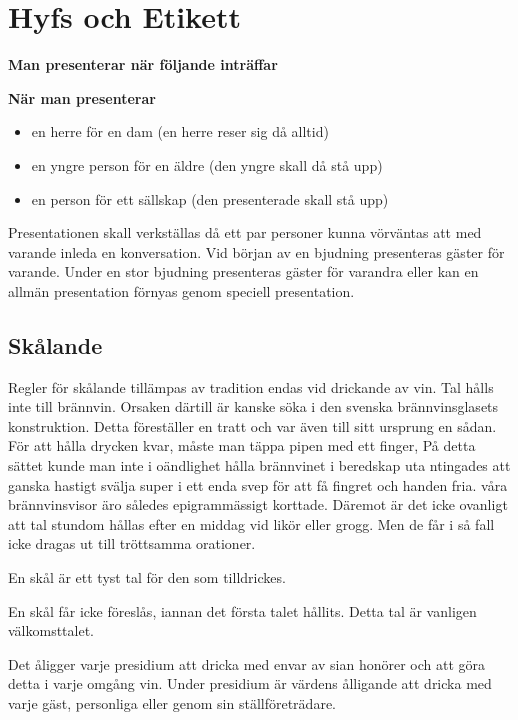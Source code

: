 \pagestyle{Hyfs och Etikett}

\section{\textbf{Hyfs och Etikett}}

\textbf{Man presenterar när följande inträffar}

\textbf{När man presenterar}

\begin{itemize}
    \item en herre för en dam (en herre reser sig då alltid)
    \item en yngre person för en äldre (den yngre skall då stå upp)
    \item en person för ett sällskap (den presenterade skall stå upp)
\end{itemize}

Presentationen skall verkställas då ett par personer kunna vörväntas att med varande inleda en konversation. Vid början av en bjudning presenteras gäster för varande. Under en stor bjudning presenteras gäster för varandra eller kan en allmän presentation förnyas genom speciell presentation.

\subsection{\textbf{Skålande}}

Regler för skålande tillämpas av tradition endas vid drickande av vin. Tal hålls inte till brännvin. Orsaken därtill är kanske söka i den svenska brännvinsglasets konstruktion. Detta föreställer en tratt och var även till sitt ursprung en sådan. För att hålla drycken kvar, måste man täppa pipen med ett finger, På detta sättet kunde man inte i oändlighet hålla brännvinet i beredskap uta ntingades att ganska hastigt svälja super i ett enda svep för att få fingret och handen fria. våra brännvinsvisor äro således epigrammässigt korttade. Däremot är det icke ovanligt att tal stundom hållas efter en middag vid likör eller grogg. Men de får i så fall icke dragas ut till tröttsamma orationer.

En skål är ett tyst tal för den som tilldrickes.

En skål får icke föreslås, iannan det första talet hållits. Detta tal är vanligen välkomsttalet.

Det åligger varje presidium att dricka med envar av sian honörer och att göra detta i varje omgång vin. Under presidium är värdens ålligande att dricka med varje gäst, personliga eller genom sin ställföreträdare.

